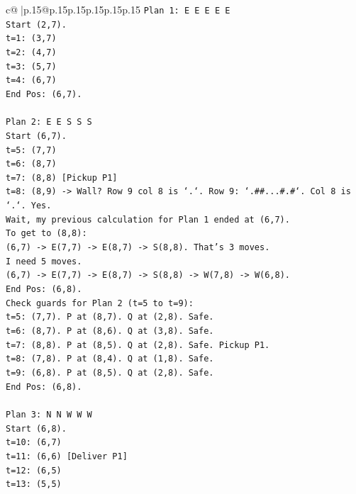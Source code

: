 \documentclass{article}
\begin{document}
{\begin{supertabular}{c@{$\;$}|p{.15\linewidth}@{}p{.15\linewidth}p{.15\linewidth}p{.15\linewidth}p{.15\linewidth}p{.15\linewidth}}
{{{\texttt{Plan 1: E E E E E} \\
\texttt{Start (2,7).} \\
\texttt{t=1: (3,7)} \\
\texttt{t=2: (4,7)} \\
\texttt{t=3: (5,7)} \\
\texttt{t=4: (6,7)} \\
\texttt{End Pos: (6,7).} \\
\\ 
\texttt{Plan 2: E E S S S} \\
\texttt{Start (6,7).} \\
\texttt{t=5: (7,7)} \\
\texttt{t=6: (8,7)} \\
\texttt{t=7: (8,8) {[}Pickup P1{]}} \\
\texttt{t=8: (8,9) {-}> Wall? Row 9 col 8 is `.`. Row 9: `.\#\#...\#.\#`. Col 8 is `.`. Yes.} \\
\texttt{Wait, my previous calculation for Plan 1 ended at (6,7).} \\
\texttt{To get to (8,8):} \\
\texttt{(6,7) {-}> E(7,7) {-}> E(8,7) {-}> S(8,8). That's 3 moves.} \\
\texttt{I need 5 moves.} \\
\texttt{(6,7) {-}> E(7,7) {-}> E(8,7) {-}> S(8,8) {-}> W(7,8) {-}> W(6,8).} \\
\texttt{End Pos: (6,8).} \\
\texttt{Check guards for Plan 2 (t=5 to t=9):} \\
\texttt{t=5: (7,7). P at (8,7). Q at (2,8). Safe.} \\
\texttt{t=6: (8,7). P at (8,6). Q at (3,8). Safe.} \\
\texttt{t=7: (8,8). P at (8,5). Q at (2,8). Safe. Pickup P1.} \\
\texttt{t=8: (7,8). P at (8,4). Q at (1,8). Safe.} \\
\texttt{t=9: (6,8). P at (8,5). Q at (2,8). Safe.} \\
\texttt{End Pos: (6,8).} \\
\\ 
\texttt{Plan 3: N N W W W} \\
\texttt{Start (6,8).} \\
\texttt{t=10: (6,7)} \\
\texttt{t=11: (6,6) {[}Deliver P1{]}} \\
\texttt{t=12: (6,5)} \\
\texttt{t=13: (5,5)} \\
}}}
\end{supertabular}}
\end{document}
